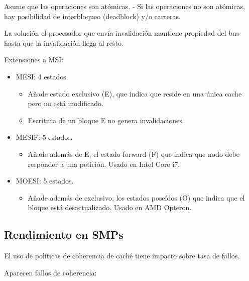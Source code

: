 \documentclass[12pt, twoside, openright]{report} %
\begin{document}
    Asume que las operaciones son atómicas. - Si las operaciones no
    son atómicas, hay posibilidad de interbloqueo (deadblock) y/o
    carreras.

    La solución el procesador que envía invalidación mantiene
    propiedad del bus hasta que la invalidación llega al resto.

    Extensiones a MSI:

    \begin{itemize}
    
    \item
      MESI: 4 estados.

      \begin{itemize}
      
      \item
        Añade estado exclusivo (E), que indica que reside en una única
        cache pero no está modificado.
      \item
        Escritura de un bloque E no genera invalidaciones.
      \end{itemize}
    \item
      MESIF: 5 estados.

      \begin{itemize}
      
      \item
        Añade además de E, el estado forward (F) que indica que nodo
        debe responder a una petición. Usado en Intel Core i7.
      \end{itemize}
    \item
      MOESI: 5 estados.

      \begin{itemize}
      
      \item
        Añade además de exclusivo, los estados poseídos (O) que indica
        que el bloque está desactualizado. Usado en AMD Opteron.
      \end{itemize}
    \end{itemize}

\subsection{Rendimiento en SMPs}


    El uso de políticas de coherencia de caché tiene impacto sobre
    tasa de fallos.

    Aparecen fallos de coherencia:
\end{document}
